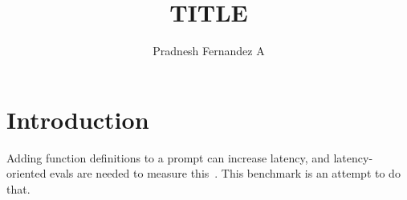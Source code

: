 \documentclass{article}
\title{TITLE}
\author{Pradnesh Fernandez A}
\date{}
\begin{document}
\maketitle

\section{Introduction}

Adding function definitions to a prompt can increase latency, and latency-oriented
evals are needed to measure this~\cite{voiceaiprimer}. This benchmark is an attempt to do that.



\end{document}
